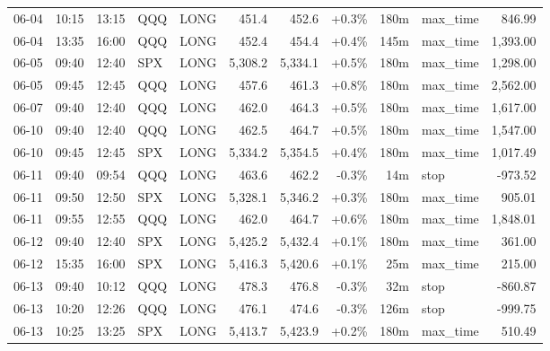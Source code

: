 \documentclass[11pt,a4paper,twoside]{article}
\begin{document}
\begin{center}
\begin{longtable}{>{\color{txtmain}}l l l l l r r r r >{\color{txtmain}}l r}
06-04 & 10:15 & 13:15 & QQQ & LONG & 451.4 & 452.6 & \textcolor{wingreen}{+0.3\%} & 180m & max\_time & \textcolor{wingreen}{846.99} \\
06-04 & 13:35 & 16:00 & QQQ & LONG & 452.4 & 454.4 & \textcolor{wingreen}{+0.4\%} & 145m & max\_time & \textcolor{wingreen}{1,393.00} \\
06-05 & 09:40 & 12:40 & SPX & LONG & 5,308.2 & 5,334.1 & \textcolor{wingreen}{+0.5\%} & 180m & max\_time & \textcolor{wingreen}{1,298.00} \\
06-05 & 09:45 & 12:45 & QQQ & LONG & 457.6 & 461.3 & \textcolor{wingreen}{+0.8\%} & 180m & max\_time & \textcolor{wingreen}{2,562.00} \\
06-07 & 09:40 & 12:40 & QQQ & LONG & 462.0 & 464.3 & \textcolor{wingreen}{+0.5\%} & 180m & max\_time & \textcolor{wingreen}{1,617.00} \\
06-10 & 09:40 & 12:40 & QQQ & LONG & 462.5 & 464.7 & \textcolor{wingreen}{+0.5\%} & 180m & max\_time & \textcolor{wingreen}{1,547.00} \\
06-10 & 09:45 & 12:45 & SPX & LONG & 5,334.2 & 5,354.5 & \textcolor{wingreen}{+0.4\%} & 180m & max\_time & \textcolor{wingreen}{1,017.49} \\
06-11 & 09:40 & 09:54 & QQQ & LONG & 463.6 & 462.2 & \textcolor{lossred}{-0.3\%} & 14m & stop & \textcolor{lossred}{-973.52} \\
06-11 & 09:50 & 12:50 & SPX & LONG & 5,328.1 & 5,346.2 & \textcolor{wingreen}{+0.3\%} & 180m & max\_time & \textcolor{wingreen}{905.01} \\
06-11 & 09:55 & 12:55 & QQQ & LONG & 462.0 & 464.7 & \textcolor{wingreen}{+0.6\%} & 180m & max\_time & \textcolor{wingreen}{1,848.01} \\
06-12 & 09:40 & 12:40 & SPX & LONG & 5,425.2 & 5,432.4 & \textcolor{wingreen}{+0.1\%} & 180m & max\_time & \textcolor{wingreen}{361.00} \\
06-12 & 15:35 & 16:00 & SPX & LONG & 5,416.3 & 5,420.6 & \textcolor{wingreen}{+0.1\%} & 25m & max\_time & \textcolor{wingreen}{215.00} \\
06-13 & 09:40 & 10:12 & QQQ & LONG & 478.3 & 476.8 & \textcolor{lossred}{-0.3\%} & 32m & stop & \textcolor{lossred}{-860.87} \\
06-13 & 10:20 & 12:26 & QQQ & LONG & 476.1 & 474.6 & \textcolor{lossred}{-0.3\%} & 126m & stop & \textcolor{lossred}{-999.75} \\
06-13 & 10:25 & 13:25 & SPX & LONG & 5,413.7 & 5,423.9 & \textcolor{wingreen}{+0.2\%} & 180m & max\_time & \textcolor{wingreen}{510.49} \\

\end{longtable}
\end{center}
\end{document}
